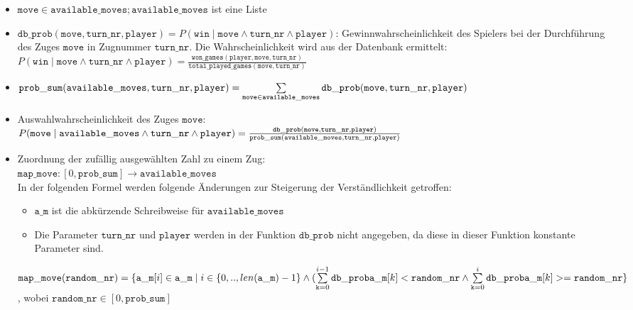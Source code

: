 \begin{itemize}
\item $\mathtt{move} \in \mathtt{available\_moves}; \mathtt{available\_moves}$ ist eine Liste
\item $\mathtt{db\_prob}(\mathtt{move}, \mathtt{turn\_nr}, \mathtt{player}) = P(\mathtt{win} \mid \mathtt{move} \land \mathtt{turn\_nr} \land \mathtt{player} )$: Gewinnwahrscheinlichkeit des Spielers bei der Durchführung des Zuges $\mathtt{move}$ in Zugnummer $\mathtt{turn\_nr}$. Die Wahrscheinlichkeit wird aus der Datenbank ermittelt:
\vspace{0.25cm}\\ $P(\mathtt{win} \mid \mathtt{move} \land \mathtt{turn\_nr} \land \mathtt{player}) = \frac{\mathtt{won\_games}(\mathtt{player}, \mathtt{move}, \mathtt{turn\_nr})}{\mathtt{total\_played\_games}(\mathtt{move}, \mathtt{turn\_nr})} $
\item $\mathtt{prob\_sum}(\mathtt{available\_moves}, \mathtt{turn\_nr}, \mathtt{player}) \\= \hfill \sum\limits_{\mathtt{move} \in \mathtt{available\_moves}} \mathtt{db\_prob}(\mathtt{move},\mathtt{turn\_nr}, \mathtt{player})$
\item Auswahlwahrscheinlichkeit des Zuges $\mathtt{move}$:
\vspace{0.25cm}\\$P(\mathtt{move} \mid \mathtt{available\_moves} \land \mathtt{turn\_nr} \land \mathtt{player}) \\= \hfill \frac{ \mathtt{db\_prob}(\mathtt{move}, \mathtt{turn\_nr}, \mathtt{player})}{\mathtt{prob\_sum}(\mathtt{available\_moves}, \mathtt{turn\_nr}, \mathtt{player})} $
\item Zuordnung der zufällig ausgewählten Zahl zu einem Zug:
\\$\mathtt{map\_move}: [ 0, \mathtt{prob\_sum}] \rightarrow \mathtt{available\_moves} $
\\ In der folgenden Formel werden folgende Änderungen zur Steigerung der Verständlichkeit getroffen:
\begin{itemize}
\item $\mathtt{a\_m}$ ist die abkürzende Schreibweise für $\mathtt{available\_moves}$
\item Die Parameter $\mathtt{turn\_nr}$ und $\mathtt{player}$ werden in der Funktion $\mathtt{db\_prob}$ nicht angegeben, da diese in dieser Funktion konstante Parameter sind.
\end{itemize}
\vspace{0.25cm}
$\mathtt{map\_move}(\mathtt{random\_nr}) = \{ \mathtt{a\_m}[i] \in \mathtt{a\_m} \mid  \\i \in \{0, .. , len(\mathtt{a\_m}) - 1\} \land (\sum\limits_{\mathtt{k} = 0}^{i - 1}{\mathtt{db\_prob}\mathtt{a\_m}[k] < \mathtt{random\_nr}} \\\land \sum\limits_{\mathtt{k} = 0}^{i}{\mathtt{db\_prob}\mathtt{a\_m}[k] >= \mathtt{random\_nr}}  \}$, wobei $\mathtt{random\_nr} \in [0, \mathtt{prob\_sum}]$

\end{itemize}
